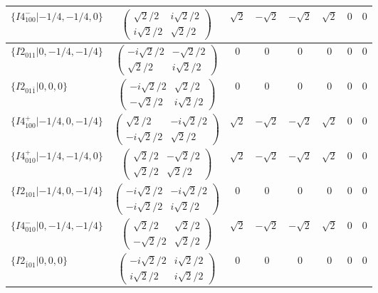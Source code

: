 \documentclass[3p,preprint]{elsarticle}
\begin{document}
\begin{table}[H]
{\begin{tabular}{|l|c||c|c|c|c|c|c|}
			$\{I4^{-}_{100}|-1/4,-1/4,0\}$ &		$\left(\begin{array}{cc} \sqrt{2}/2&i\sqrt{2}/2 \\ i\sqrt{2}/2&\sqrt{2}/2 \end{array}\right)$	&$\sqrt{2}$ & $-\sqrt{2}$ & $-\sqrt{2}$ & $\sqrt{2}$ & $0$ & $0$ \\ \hline
			$\{I2_{011}|0,-1/4,-1/4\}$ &		$\left(\begin{array}{cc} -i\sqrt{2}/2&-\sqrt{2}/2 \\ \sqrt{2}/2&i\sqrt{2}/2 \end{array}\right)$	&$0$ & $0$ & $0$ & $0$ & $0$ & $0$ \\ \hline
			$\{I2_{01\bar{1}}|0,0,0\}$ &		$\left(\begin{array}{cc} -i\sqrt{2}/2&\sqrt{2}/2 \\ -\sqrt{2}/2&i\sqrt{2}/2 \end{array}\right)$	&$0$ & $0$ & $0$ & $0$ & $0$ & $0$ \\ \hline
			$\{I4^{+}_{100}|-1/4,0,-1/4\}$ &		$\left(\begin{array}{cc} \sqrt{2}/2&-i\sqrt{2}/2 \\ -i\sqrt{2}/2&\sqrt{2}/2 \end{array}\right)$	&$\sqrt{2}$ & $-\sqrt{2}$ & $-\sqrt{2}$ & $\sqrt{2}$ & $0$ & $0$ \\ \hline
			$\{I4^{+}_{010}|-1/4,-1/4,0\}$ &		$\left(\begin{array}{cc} \sqrt{2}/2&-\sqrt{2}/2 \\ \sqrt{2}/2&\sqrt{2}/2 \end{array}\right)$	&$\sqrt{2}$ & $-\sqrt{2}$ & $-\sqrt{2}$ & $\sqrt{2}$ & $0$ & $0$ \\ \hline
			$\{I2_{101}|-1/4,0,-1/4\}$ &		$\left(\begin{array}{cc} -i\sqrt{2}/2&-i\sqrt{2}/2 \\ -i\sqrt{2}/2&i\sqrt{2}/2 \end{array}\right)$	&$0$ & $0$ & $0$ & $0$ & $0$ & $0$ \\ \hline
			$\{I4^{-}_{010}|0,-1/4,-1/4\}$ &		$\left(\begin{array}{cc} \sqrt{2}/2&\sqrt{2}/2 \\ -\sqrt{2}/2&\sqrt{2}/2 \end{array}\right)$	&$\sqrt{2}$ & $-\sqrt{2}$ & $-\sqrt{2}$ & $\sqrt{2}$ & $0$ & $0$ \\ \hline
			
			$\{I2_{\bar{1}01}|0,0,0\}$ &		$\left(\begin{array}{cc} -i\sqrt{2}/2&i\sqrt{2}/2 \\ i\sqrt{2}/2&i\sqrt{2}/2 \end{array}\right)$	&$0$ & $0$ & $0$ & $0$ & $0$ & $0$ \\ \hline
		\end{tabular}
		}
\end{table}
\end{document}
